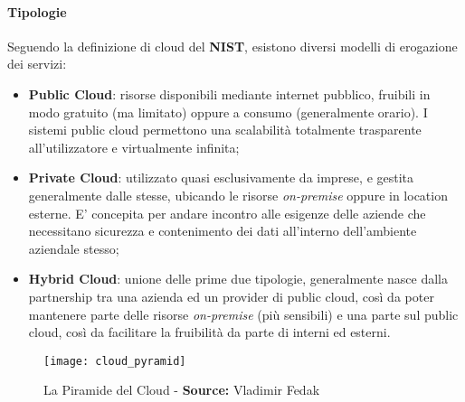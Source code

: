 \documentclass[../main.tex]{subfiles}
\begin{document}
    	    \paragraph{Tipologie}
    	    Seguendo la definizione di cloud del \textbf{NIST}\cite{cloud_nist}, esistono diversi modelli di erogazione dei servizi:
    	    \begin{itemize}
    	        \item \textbf{Public Cloud}: risorse disponibili mediante internet pubblico, fruibili in modo gratuito (ma limitato) oppure a consumo (generalmente orario). I sistemi public cloud permettono una scalabilità totalmente trasparente all'utilizzatore e virtualmente infinita;
    	        \item \textbf{Private Cloud}: utilizzato quasi esclusivamente da imprese, e gestita generalmente dalle stesse, ubicando le risorse \emph{on-premise} oppure in location esterne. E' concepita per andare incontro alle esigenze delle aziende che necessitano sicurezza e contenimento dei dati all'interno dell'ambiente aziendale stesso;
    	        \item \textbf{Hybrid Cloud}: unione delle prime due tipologie, generalmente nasce dalla partnership tra una azienda ed un provider di public cloud, così da poter mantenere parte delle risorse \emph{on-premise} (più sensibili) e una parte sul public cloud, così da facilitare la fruibilità da parte di interni ed esterni.
    	    \end{itemize}
    	    
    	    \begin{figure}[h]
    			\centering
    			\texttt{[image: cloud\_pyramid]}
    			\caption{La Piramide del Cloud - \textbf{Source:} Vladimir Fedak}
    			\label{fig:cloud_pyramid}
    	    \end{figure}
    	    
\end{document}
